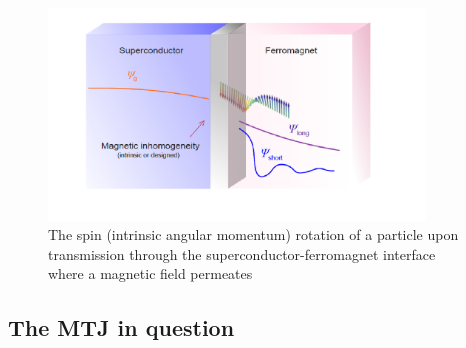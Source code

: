 \documentclass[12pt]{article}
\begin{document}
\begin{figure}[htp]
    \centering
    \begin{measuredfigure}
    \includegraphics[width=10cm]{rot}
    \caption{The spin (intrinsic angular momentum) rotation of a particle upon transmission through the superconductor-ferromagnet interface where a magnetic field permeates}
    \end{measuredfigure}
    \end{figure}




\subsection{The MTJ in question}
\end{document}
